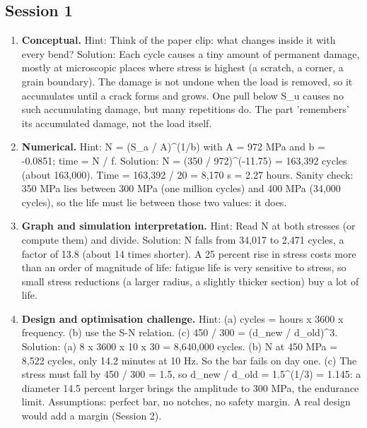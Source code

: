 \documentclass[11pt,a4paper]{article}
\begin{document}
\subsection*{Session 1}
\begin{enumerate}[nosep]
\item \textbf{Conceptual.} Hint: Think of the paper clip: what changes inside it with every bend? Solution: Each cycle causes a tiny amount of permanent damage, mostly at microscopic places where stress is highest (a scratch, a corner, a grain boundary). The damage is not undone when the load is removed, so it accumulates until a crack forms and grows. One pull below S\_u causes no such accumulating damage, but many repetitions do. The part 'remembers' its accumulated damage, not the load itself.
\item \textbf{Numerical.} Hint: N = (S\_a / A)\textasciicircum{}(1/b) with A = 972 MPa and b = -0.0851; time = N / f. Solution: N = (350 / 972)\textasciicircum{}(-11.75) = 163,392 cycles (about 163,000). Time = 163,392 / 20 = 8,170 s = 2.27 hours. Sanity check: 350 MPa lies between 300 MPa (one million cycles) and 400 MPa (34,000 cycles), so the life must lie between those two values: it does.
\item \textbf{Graph and simulation interpretation.} Hint: Read N at both stresses (or compute them) and divide. Solution: N falls from 34,017 to 2,471 cycles, a factor of 13.8 (about 14 times shorter). A 25 percent rise in stress costs more than an order of magnitude of life: fatigue life is very sensitive to stress, so small stress reductions (a larger radius, a slightly thicker section) buy a lot of life.
\item \textbf{Design and optimisation challenge.} Hint: (a) cycles = hours x 3600 x frequency. (b) use the S-N relation. (c) 450 / 300 = (d\_new / d\_old)\textasciicircum{}3. Solution: (a) 8 x 3600 x 10 x 30 = 8,640,000 cycles. (b) N at 450 MPa = 8,522 cycles, only 14.2 minutes at 10 Hz. So the bar fails on day one. (c) The stress must fall by 450 / 300 = 1.5, so d\_new / d\_old = 1.5\textasciicircum{}(1/3) = 1.145: a diameter 14.5 percent larger brings the amplitude to 300 MPa, the endurance limit. Assumptions: perfect bar, no notches, no safety margin. A real design would add a margin (Session 2).
\end{enumerate}
\end{document}
